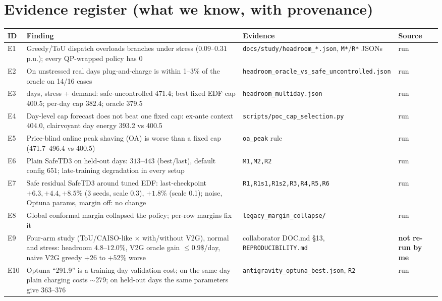 \documentclass[10pt,a4paper]{article}
\begin{document}
\section{Evidence register (what we know, with provenance)}
\small
\begin{longtable}{@{}p{.045\linewidth}>{\raggedright\arraybackslash}p{.47\linewidth}>{\raggedright\arraybackslash}p{.30\linewidth}>{\raggedright\arraybackslash}p{.11\linewidth}@{}}
\toprule ID & Finding & Evidence & Source\\\midrule\endhead
E1 & Greedy/ToU dispatch overloads branches under stress ($0.09$--$0.31$ p.u.); every QP-wrapped policy has $0$ & \texttt{docs/study/headroom\_*.json}, \texttt{M*}/\texttt{R*} JSONs & run\\
E2 & On unstressed real days plug-and-charge is within 1--3\% of the oracle on 14/16 cases & \texttt{headroom\_oracle\_vs\allowbreak\_safe\_uncontrolled.json} & run\\
E3 & 20 days, stress + demand: safe-uncontrolled 471.4; best fixed EDF cap 400.5; per-day cap 382.4; oracle 379.5 & \texttt{headroom\_multiday.json} & run\\
E4 & Day-level cap forecast does not beat one fixed cap: ex-ante context 404.0, clairvoyant day energy 393.2 vs 400.5 & \texttt{scripts/poc\_cap\_selection.py} & run\\
E5 & Price-blind online peak shaving (OA) is worse than a fixed cap (471.7--496.4 vs 400.5) & \texttt{oa\_peak} rule & run\\
E6 & Plain SafeTD3 on held-out days: $313$--$443$ (best/last), default config $651$; late-training degradation in every setup & \texttt{M1,M2,R2} & run\\
E7 & Safe residual SafeTD3 around tuned EDF: last-checkpoint $+6.3,+4.4,+8.5\%$ (3 seeds, scale 0.3), $+1.8\%$ (scale 0.1); noise, Optuna params, margin off: no change & \texttt{R1,R1s1,R1s2,R3,R4,R5,R6} & run\\
E8 & Global conformal margin collapsed the policy; per-row margins fix it & \texttt{legacy\_margin\_collapse/} & run\\
E9 & Four-arm study (ToU/CAISO-like $\times$ with/without V2G), normal and stress: headroom $4.8$--$12.0\%$, V2G oracle gain $\le0.9$\$/day, naive V2G greedy $+26$ to $+52\%$ worse & collaborator DOC.md \S13, \texttt{REPRODUCIBILITY.md} & \textbf{not re-run by me}\\
E10 & Optuna ``291.9'' is a training-day validation cost; on the same day plain charging costs $\sim$279; on held-out days the same parameters give 363--376 & \texttt{antigravity\_optuna\_best.json}, \texttt{R2} & run\\
\bottomrule\end{longtable}
\end{document}

